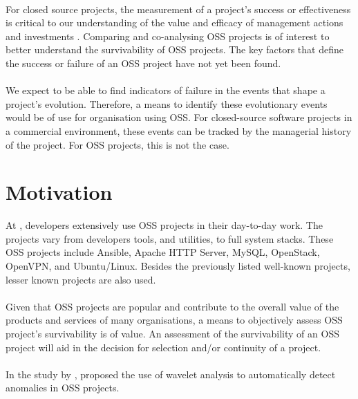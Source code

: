 \paragraph{}
For closed source projects, the measurement of a project's success or
effectiveness is critical to our understanding of the value and efficacy of
management actions and investments \cite{delone2003}. Comparing and
co-analysing OSS projects is of interest to better understand the survivability
of OSS projects. The key factors that define the success or failure of an OSS
project have not yet been found.

\paragraph{}
We expect to be able to find indicators of failure in the events that
shape a project's evolution. Therefore, a means to identify these evolutionary
events would be of use for organisation using OSS. For closed-source software
projects in a commercial environment, these events can be tracked by the
managerial history of the project. For OSS projects, this is not the case.



\section{Motivation}
At \hostOrg, developers extensively use OSS projects in their day-to-day
work. The projects vary from developers tools, and utilities, to full system
stacks. These OSS projects include Ansible, Apache HTTP Server, MySQL,
OpenStack, OpenVPN, and Ubuntu/Linux. Besides the previously listed well-known
projects, lesser known projects are also used.

\paragraph{}
Given that OSS projects are popular and contribute to the overall value of the
products and services of many organisations, a means to objectively assess OSS
project's survivability is of value. An assessment of the survivability of an
OSS project will aid in the decision for selection and/or continuity of a
project.

\paragraph{}
In the study \textit{\repltitle} by \citet{karus2013}, \citeauthor{karus2013}
proposed the use of wavelet analysis to automatically detect anomalies in OSS
projects.


